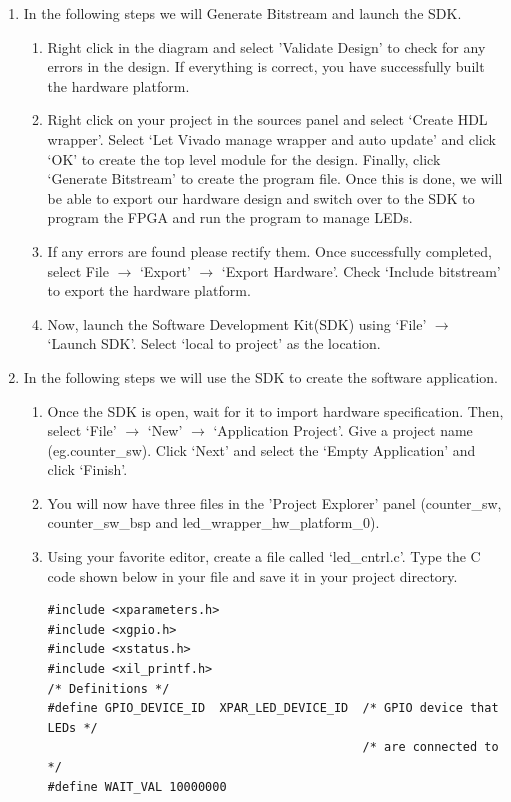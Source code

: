 \documentclass[11pt,twoside,titlepage]{article}
\begin{document}
\begin{enumerate}
\begin{enumerate}
			
		\end{enumerate}
		\item In the following steps we will Generate Bitstream and launch the SDK.
		\begin{enumerate}
			
			
			\item Right click in the diagram and select 'Validate Design' to check for any errors in the design. If everything is correct, you have successfully built the hardware platform. 
			\item Right click on your project in the sources panel and select `Create HDL wrapper'. Select `Let Vivado manage wrapper and auto update'  and click `OK' to create the top level module for the design. Finally,  click `Generate Bitstream' to create the program file. Once this is done, we will be able to export our hardware design and switch over to the SDK to program the FPGA and run the program to manage LEDs.
			\item If any errors are found please rectify them. Once successfully completed, select File $\rightarrow$ `Export'  $\rightarrow$ `Export Hardware'. Check `Include bitstream' to export the hardware platform.
			\item Now, launch the Software Development Kit(SDK) using `File' $\rightarrow$ `Launch SDK'. Select `local to project' as the location.
			
		\end{enumerate}
		
		\item In the following steps we will use the SDK to create the software application.
		\begin{enumerate}
			
			\item Once the SDK is open, wait for it to import hardware specification. Then, select `File' $\rightarrow$ `New' $\rightarrow$ `Application Project'. Give a project name (eg.counter\_sw). Click `Next' and select the `Empty Application' and click `Finish'.
			\item You will now have three files in the 'Project Explorer' panel (counter\_sw, counter\_sw\_bsp and led\_wrapper\_hw\_platform\_0). 
			\item Using your favorite editor, create a file called `led\_cntrl.c'. Type the  C code shown below in your file and save it in your project directory.
			\begin{lstlisting}
#include <xparameters.h>
#include <xgpio.h>
#include <xstatus.h>
#include <xil_printf.h>
/* Definitions */
#define GPIO_DEVICE_ID  XPAR_LED_DEVICE_ID	/* GPIO device that LEDs */
                                        	/* are connected to  */
#define WAIT_VAL 10000000				


\end{lstlisting}
\end{enumerate}
\end{enumerate}
\end{document}
